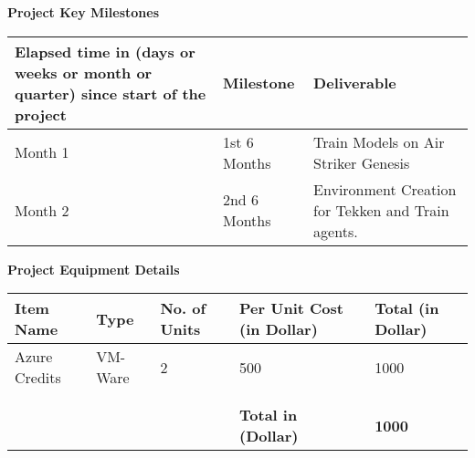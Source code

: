 \documentclass{article} %
\begin{document}
	\textbf{}
	
	\noindent \textbf{}
	
	\noindent \eject \textbf{}
	
	\noindent \textbf{\large Project Key Milestones}
	
	\begin{tabular}{|p{2.21in}|p{1.0in}|p{1.61in}|} \hline 
		\textbf{Elapsed time in (days or weeks or month or quarter) since start of the project} & \textbf{Milestone} & \textbf{Deliverable} \\ \hline 
		Month 1\textbf{} & 1st 6 Months\textbf{} & Train Models on Air Striker Genesis  \\ \hline 
		Month 2\textbf{} & 2nd 6 Months\textbf{} & Environment Creation for Tekken and Train agents. \textbf{} \\ \hline 
	\end{tabular}
	
	\textbf{ }
	
	\noindent \textbf{\large Project Equipment Details}
	
	\begin{tabular}{|p{0.9in}|p{0.9in}|p{0.9in}|p{0.9in}|p{0.9in}|} \hline 
		\textbf{Item Name} & \textbf{Type} & \textbf{No. of Units} & \textbf{Per Unit Cost (in Dollar)} & \textbf{Total (in Dollar)} \\ \hline 
		Azure Credits\textbf{} & VM-Ware\textbf{} & 2\textbf{} & 500\textbf{} & 1000 \\ \hline 
		\textbf{} & \textbf{} &  & \textbf{} & \\ \hline 
		\textbf{} & \textbf{} & \textbf{} & \textbf{} & \textbf{} \\ \hline 
		&  &  & \textbf{Total in (Dollar)} & \textbf{1000} \\ \hline 
	\end{tabular}
	
	\textbf{}
	
	\noindent 
	
	\noindent 
	
	
\end{document}
